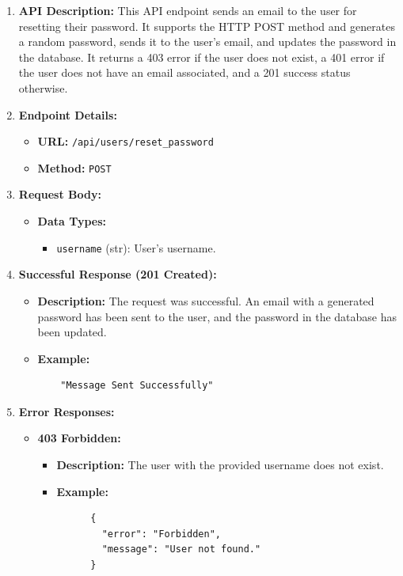 \documentclass[a4 paper, 12pt]{article}
\begin{document}
\begin{enumerate}
  \item \textbf{API Description:} This API endpoint sends an email to the user for resetting their password. It supports the HTTP POST method and generates a random password, sends it to the user's email, and updates the password in the database. It returns a 403 error if the user does not exist, a 401 error if the user does not have an email associated, and a 201 success status otherwise.

  \item \textbf{Endpoint Details:}
  \begin{itemize}
    \item \textbf{URL:} \texttt{/api/users/reset\_password}
    \item \textbf{Method:} \texttt{POST}
  \end{itemize}

  \item \textbf{Request Body:}
  \begin{itemize}
    \item \textbf{Data Types:}
    \begin{itemize}
      \item \texttt{username} (str): User's username.
    \end{itemize}
  \end{itemize}

  \item \textbf{Successful Response (201 Created):}
  \begin{itemize}
    \item \textbf{Description:} The request was successful. An email with a generated password has been sent to the user, and the password in the database has been updated.
    \item \textbf{Example:}
    \begin{verbatim}
    "Message Sent Successfully"
    \end{verbatim}
  \end{itemize}

  \item \textbf{Error Responses:}
  \begin{itemize}
    \item \textbf{403 Forbidden:}
    \begin{itemize}
      \item \textbf{Description:} The user with the provided username does not exist.
      \item \textbf{Example:}
      \begin{verbatim}
      {
        "error": "Forbidden",
        "message": "User not found."
      }
      \end{verbatim}
    \end{itemize}


\end{itemize}
\end{enumerate}
\end{document}
